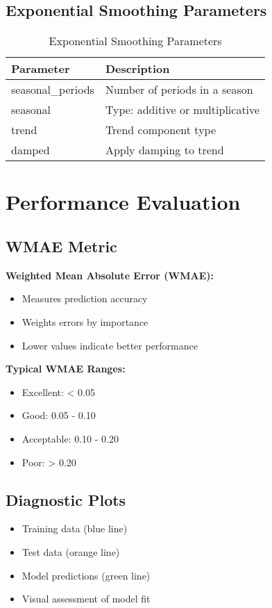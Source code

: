 \subsection{Exponential Smoothing Parameters}
\begin{table}[h]
	\centering
	\begin{tabular}{|l|l|}
		\hline
		\textbf{Parameter} & \textbf{Description} \\
		\hline
		seasonal\_periods & Number of periods in a season \\
		seasonal & Type: additive or multiplicative \\
		trend & Trend component type \\
		damped & Apply damping to trend \\
		\hline
	\end{tabular}
	\caption{Exponential Smoothing Parameters}
\end{table}

\section{Performance Evaluation}

\subsection{WMAE Metric}
\textbf{Weighted Mean Absolute Error (WMAE):}
\begin{itemize}
	\item Measures prediction accuracy
	\item Weights errors by importance
	\item Lower values indicate better performance
\end{itemize}

\textbf{Typical WMAE Ranges:}
\begin{itemize}
	\item Excellent: < 0.05
	\item Good: 0.05 - 0.10
	\item Acceptable: 0.10 - 0.20
	\item Poor: > 0.20
\end{itemize}

\subsection{Diagnostic Plots}
\begin{itemize}
	\item Training data (blue line)
	\item Test data (orange line)
	\item Model predictions (green line)
	\item Visual assessment of model fit
\end{itemize}


